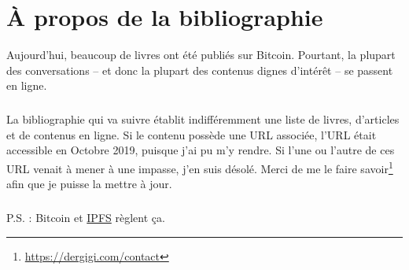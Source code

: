 \chapter*{À propos de la bibliographie}

Aujourd'hui, beaucoup de livres ont été publiés sur Bitcoin. Pourtant, la
plupart des conversations -- et donc la plupart des contenus dignes d'intérêt --
se passent en ligne.

\paragraph{}
La bibliographie qui va suivre établit indifféremment une liste de livres,
d'articles et de contenus en ligne. Si le contenu possède une URL associée, l'URL
était accessible en Octobre 2019, puisque j'ai pu m'y rendre. Si l'une ou
l'autre de ces URL venait à mener à une impasse, j'en suis désolé. Merci de me
le faire savoir\footnote{\url{https://dergigi.com/contact}} afin que je puisse
la mettre à jour.

\paragraph{}
P.S. : Bitcoin et \href{https://ipfs.io/}{IPFS} règlent ça.
